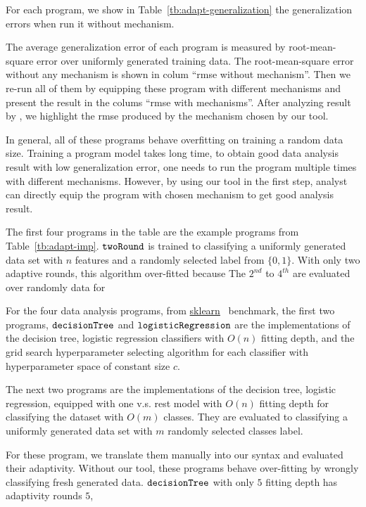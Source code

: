 For each program, we show in Table~\ref{tb:adapt-generalization} the generalization errors when run it without mechanism.

The average generalization error of each program is measured by root-mean-square error over uniformly generated training data.
The root-mean-square error without any mechanism is shown in colum ``rmse without mechanism''.
Then we re-run all of them by equipping these program with different mechanisms and present the result
in the colums ``rmse with mechanisms''.
After analyzing result by {\THESYSTEM}, we highlight the rmse produced by the mechanism chosen by our tool.

In general, all of these programs behave overfitting on training a random data size. 
Training a program model takes long time, to obtain good data analysis result with low generalization error,
one needs to run the program multiple times with different mechanisms.
However, by using our tool in the first step, analyst can directly equip the program with chosen mechanism to get good
analysis result.


The first four programs in the table are the example programs from Table~\ref{tb:adapt-imp}.
$\mathtt{twoRound}$ is trained to classifying a uniformly generated data set with $n$ features and a randomly selected label from $\{0, 1\}$. 
With only two adaptive rounds, this algorithm over-fitted because 
The $2^{nd}$ to $4^{th}$ are evaluated over randomly data for 

For the four data analysis programs, 
from \hyperlink{https://github.com/scikit-learn/scikit-learn/tree/main/examples}{sklearn}~\cite{SklearnBenchmark} benchmark,
the first two programs, $\mathtt{decisionTree}$ and $\mathtt{logisticRegression}$ are
the
implementations of the decision tree, logistic regression classifiers
with $O(n)$ fitting depth,
and the grid search hyperparameter selecting algorithm for each classifier with 
hyperparameter space of constant size $c$.

The next two programs are
the implementations of the  decision tree, logistic regression, equipped with one v.s. rest model with $O(n)$ fitting depth for classifying the dataset with $O(m)$ classes.
They are evaluated to classifying a uniformly generated data set with $m$ randomly selected classes label.

For these program, we translate them manually into our syntax and evaluated their adaptivity.
Without our tool, these programs behave over-fitting by wrongly classifying fresh generated data.
$\mathtt{decisionTree}$  with only $5$ fitting depth has adaptivity rounds $5$,






